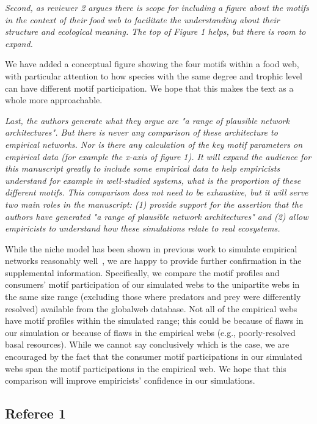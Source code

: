 \documentclass[12pt]{article}
\newcommand{\us}{\rm \setlength{\leftskip}{0.3cm} \setlength{\rightskip}{0.3cm}}
\newcommand{\them}{\it \setlength{\leftskip}{0cm} \setlength{\rightskip}{0cm}}
\begin{document}
    \them
    Second, as reviewer 2 argues there is scope for including a figure about the motifs in the context of their food web to facilitate the understanding about their structure and ecological meaning. The top of Figure 1 helps, but there is room to expand.  
    
    \us
    We have added a conceptual figure showing the four motifs within a food web, with particular attention to how species with the same degree and trophic level can have different motif participation. We hope that this makes the text as a whole more approachable.

    \them
    Last, the authors generate what they argue are "a range of plausible network architectures".  But there is never any comparison of these architecture to empirical networks.  Nor is there any calculation of the key motif parameters on empirical data (for example the x-axis of figure 1). It will expand the audience for this manuscript greatly to include some empirical data to help empiricists understand for example in well-studied systems, what is the proportion of these different motifs.  This comparison does not need to be exhaustive, but it will serve two main roles in the manuscript: (1) provide support for the assertion that the authors have generated "a range of plausible network architectures" and (2) allow empiricists to understand how these simulations relate to real ecosystems.  
    
    \us
    While the niche model has been shown in previous work to simulate empirical networks reasonably well~\citep{Stouffer2005a,Stouffer2006}, we are happy to provide further confirmation in the supplemental information.
    Specifically, we compare the motif profiles and consumers' motif participation of our simulated webs to the  unipartite webs in the same size range (excluding those where predators and prey were differently resolved) available from the globalweb database.
    Not all of the empirical webs have motif profiles within the simulated range; this could be because of flaws in our simulation or because of flaws in the empirical webs (e.g., poorly-resolved basal resources). 
    While we cannot say conclusively which is the case, we are encouraged by the fact that the consumer motif participations in our simulated webs span the motif participations in the empirical web.
    We hope that this comparison will improve empiricists' confidence in our simulations.

\clearpage

\subsection*{Referee 1}
\end{document}
